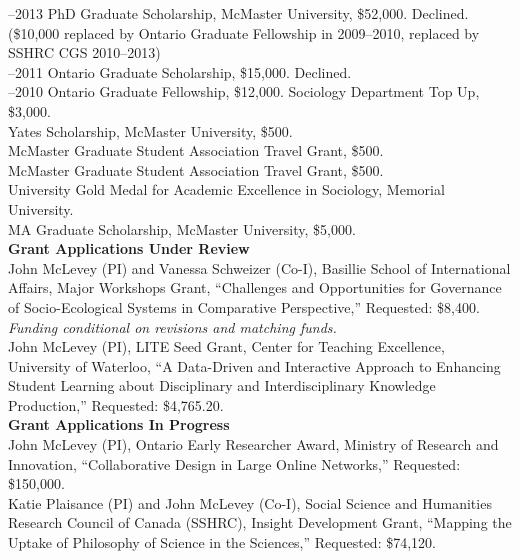 \documentclass[9pt,usenames,dvipsnames]{article}
\begin{document}
–2013 PhD Graduate Scholarship, McMaster University, \$52,000. Declined. (\$10,000 replaced by Ontario Graduate Fellowship in 2009–2010, replaced by SSHRC CGS 2010–2013)\\

–2011 Ontario Graduate Scholarship, \$15,000. Declined.\\

–2010 Ontario Graduate Fellowship, \$12,000. Sociology Department Top Up, \$3,000.\\

 Yates Scholarship, McMaster University, \$500.\\

 McMaster Graduate Student Association Travel Grant, \$500.\\

 McMaster Graduate Student Association Travel Grant, \$500.\\

 University Gold Medal for Academic Excellence in Sociology, Memorial University.\\

 MA Graduate Scholarship, McMaster University, \$5,000.\\

\noindent \textbf{Grant Applications Under Review} \\

\ind John McLevey (PI) and Vanessa Schweizer (Co-I), Basillie School of International Affairs, Major Workshops Grant, ``Challenges and Opportunities for Governance of Socio-Ecological Systems in Comparative Perspective,'' Requested: \$8,400. \emph{Funding conditional on revisions and matching funds.} \\

\ind John McLevey (PI), LITE Seed Grant, Center for Teaching Excellence, University of Waterloo, ``A Data-Driven and Interactive Approach to Enhancing Student Learning about Disciplinary and Interdisciplinary Knowledge Production,'' Requested: \$4,765.20. \\

\noindent \textbf{Grant Applications In Progress} \\

\ind John McLevey (PI), Ontario Early Researcher Award, Ministry of Research and Innovation, ``Collaborative Design in Large Online Networks,'' Requested: \$150,000. \\

\ind Katie Plaisance (PI) and John McLevey (Co-I), Social Science and Humanities Research Council of Canada (SSHRC), Insight Development Grant, ``Mapping the Uptake of Philosophy of Science in the Sciences,'' Requested: \$74,120. \\
\end{document}
